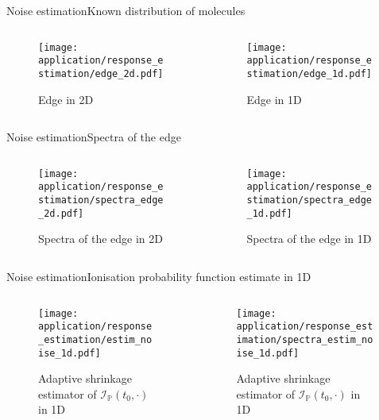 \begin{frame}{Noise estimation}{Known distribution of molecules}
\begin{columns}
\begin{column}{8cm}
\begin{figure}[H]
		\label{edge_2d}\caption{Edge in 2D}
		\centering
    	\texttt{[image: application/response\_estimation/edge\_2d.pdf]}
	\end{figure}
\end{column}
\begin{column}{8cm}
\begin{figure}[H]
		\label{edge_1d}\caption{Edge in 1D}
		\centering
    	\texttt{[image: application/response\_estimation/edge\_1d.pdf]}
	\end{figure}
\end{column}
\end{columns}
\end{frame}

\begin{frame}{Noise estimation}{Spectra of the edge}
\begin{columns}
\begin{column}{8cm}
\begin{figure}[H]
		\label{edge_2d}\caption{Spectra of the edge in 2D}
		\centering
    	\texttt{[image: application/response\_estimation/spectra\_edge\_2d.pdf]}
	\end{figure}
\end{column}
\begin{column}{8cm}
\begin{figure}[H]
		\label{edge_2d}\caption{Spectra of the edge in 1D}
		\centering
    	\texttt{[image: application/response\_estimation/spectra\_edge\_1d.pdf]}
	\end{figure}
\end{column}
\end{columns}
\end{frame}

\begin{frame}{Noise estimation}{Ionisation probability function estimate in 1D}
\begin{columns}
\begin{column}{8cm}
\begin{figure}[H]
		\label{edge_2d}\caption{Adaptive shrinkage estimator of $\mathcal{I}_{\mathds{P}}(t_{0}, \cdot)$ in 1D}
		\centering
    	\texttt{[image: application/response\_estimation/estim\_noise\_1d.pdf]}
	\end{figure}
\end{column}
\begin{column}{8cm}
\begin{figure}[H]
		\label{edge_2d}\caption{Adaptive shrinkage estimator of $\mathcal{I}_{\mathds{P}}(t_{0}, \cdot)$ in 1D}
		\centering
    	\texttt{[image: application/response\_estimation/spectra\_estim\_noise\_1d.pdf]}
	\end{figure}
\end{column}
\end{columns}
\end{frame}

